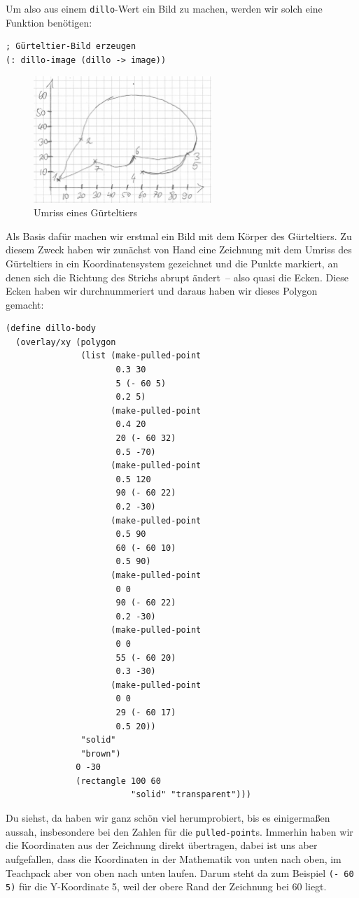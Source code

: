 Um also aus einem \lstinline{dillo}-Wert ein Bild zu machen, werden
wir solch eine Funktion benötigen:
%
\begin{lstlisting}
; Gürteltier-Bild erzeugen
(: dillo-image (dillo -> image))
\end{lstlisting}
%
\begin{figure}[tb]
  \centering
  \includegraphics[width=0.6\textwidth]{i1world/dillo}
  \caption{Umriss eines Gürteltiers}
  \label{fig:dillo-body}
\end{figure}
Als Basis dafür machen wir erstmal ein Bild mit dem Körper des
Gürteltiers.  Zu diesem Zweck haben wir zunächst von Hand eine
Zeichnung mit dem Umriss des Gürteltiers in ein Koordinatensystem
gezeichnet und die Punkte markiert, an denen sich die Richtung des
Strichs abrupt ändert~-- also quasi die Ecken.  Diese Ecken haben wir
durchnummeriert und daraus haben wir dieses Polygon gemacht:
%
\begin{lstlisting}
(define dillo-body
  (overlay/xy (polygon
               (list (make-pulled-point
                      0.3 30
                      5 (- 60 5)
                      0.2 5)
                     (make-pulled-point
                      0.4 20
                      20 (- 60 32)
                      0.5 -70)
                     (make-pulled-point
                      0.5 120 
                      90 (- 60 22)
                      0.2 -30)
                     (make-pulled-point
                      0.5 90
                      60 (- 60 10)
                      0.5 90)
                     (make-pulled-point
                      0 0 
                      90 (- 60 22)
                      0.2 -30)
                     (make-pulled-point
                      0 0
                      55 (- 60 20)
                      0.3 -30)
                     (make-pulled-point
                      0 0
                      29 (- 60 17)
                      0.5 20))
               "solid"
               "brown")
              0 -30
              (rectangle 100 60
                         "solid" "transparent")))
\end{lstlisting}
%
Du siehst, da haben wir ganz schön viel herumprobiert, bis es
einigermaßen aussah, insbesondere bei den Zahlen für die
\lstinline{pulled-point}s.  Immerhin haben wir die Koordinaten aus der
Zeichnung direkt übertragen, dabei ist uns aber aufgefallen, dass die
Koordinaten in der Mathematik von unten nach oben, im Teachpack aber
von oben nach unten laufen.  Darum steht da zum Beispiel
\lstinline{(- 60 5)} für die Y-Koordinate 5, weil der obere Rand der
Zeichnung bei 60 liegt.

